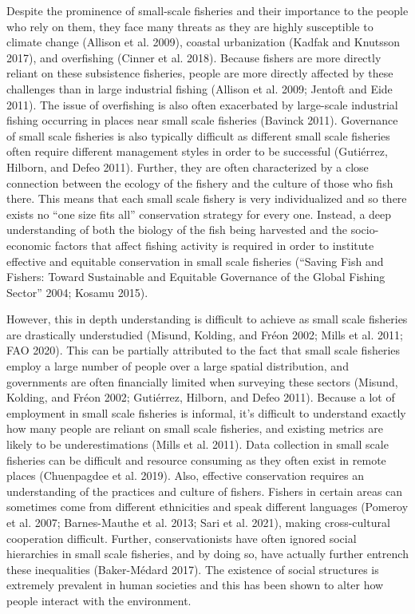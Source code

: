 \documentclass[
]{article}
\begin{document}
Despite the prominence of small-scale fisheries and their importance to the people who rely on them, they face many threats as they are highly susceptible to climate change (Allison et al. 2009), coastal urbanization (Kadfak and Knutsson 2017), and overfishing (Cinner et al. 2018). Because fishers are more directly reliant on these subsistence fisheries, people are more directly affected by these challenges than in large industrial fishing (Allison et al. 2009; Jentoft and Eide 2011). The issue of overfishing is also often exacerbated by large-scale industrial fishing occurring in places near small scale fisheries (Bavinck 2011). Governance of small scale fisheries is also typically difficult as different small scale fisheries often require different management styles in order to be successful (Gutiérrez, Hilborn, and Defeo 2011). Further, they are often characterized by a close connection between the ecology of the fishery and the culture of those who fish there. This means that each small scale fishery is very individualized and so there exists no ``one size fits all'' conservation strategy for every one. Instead, a deep understanding of both the biology of the fish being harvested and the socio-economic factors that affect fishing activity is required in order to institute effective and equitable conservation in small scale fisheries ({``Saving {Fish} and {Fishers}: {Toward} {Sustainable} and {Equitable} {Governance} of the {Global} {Fishing} {Sector}''} 2004; Kosamu 2015).

However, this in depth understanding is difficult to achieve as small scale fisheries are drastically understudied (Misund, Kolding, and Fréon 2002; Mills et al. 2011; FAO 2020). This can be partially attributed to the fact that small scale fisheries employ a large number of people over a large spatial distribution, and governments are often financially limited when surveying these sectors (Misund, Kolding, and Fréon 2002; Gutiérrez, Hilborn, and Defeo 2011). Because a lot of employment in small scale fisheries is informal, it's difficult to understand exactly how many people are reliant on small scale fisheries, and existing metrics are likely to be underestimations (Mills et al. 2011). Data collection in small scale fisheries can be difficult and resource consuming as they often exist in remote places (Chuenpagdee et al. 2019). Also, effective conservation requires an understanding of the practices and culture of fishers. Fishers in certain areas can sometimes come from different ethnicities and speak different languages (Pomeroy et al. 2007; Barnes-Mauthe et al. 2013; Sari et al. 2021), making cross-cultural cooperation difficult. Further, conservationists have often ignored social hierarchies in small scale fisheries, and by doing so, have actually further entrench these inequalities (Baker-Médard 2017). The existence of social structures is extremely prevalent in human societies and this has been shown to alter how people interact with the environment.
\end{document}
